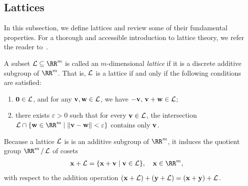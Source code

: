 \documentclass{fundam}
\begin{document}
\subsection{Lattices}\label{Lattices}
In this subsection, we define lattices and review some of their fundamental properties. For a thorough and accessible introduction to lattice theory, we refer the reader to~\cite{peikert2015decade}.

\vspace{0.5cm}
A subset $\Lat \subseteq \RR^m$ is called an $m$-dimensional \textit{lattice} if it is a discrete additive subgroup of $\RR^m$. That is, $\mathcal{L}$ is a lattice if and only if the following conditions are satisfied:
\begin{enumerate}
	\item $\mathbf{0} \in \mathcal{L}$, and for any $\mathbf{v}, \mathbf{w} \in \mathcal{L}$, we have $-\mathbf{v},\, \mathbf{v} + \mathbf{w} \in \mathcal{L}$;
	\item there exists $\varepsilon > 0$ such that for every $\mathbf{v} \in \mathcal{L}$, the intersection $\Lat \cap \{ \vr{w} \in \RR^m \mid \| \vr{v} - \vr{w} \| < \varepsilon \}$ contains only $\mathbf{v}$.
\end{enumerate}


Because a lattice $\mathcal{L}$ is is an additive subgroup of $\RR^{m}$, it induces the quotient group $\quotient{\RR^{m}}{\Lat}$ of cosets
\begin{align*}
	\vr{x} + \Lat = \{ \vr{x}+\vr{v} \mid \vr{v}\in\Lat  \}, ~~~\vr{x}\in\RR^{m},
\end{align*}
with respect to the addition operation $(\mathbf{x}+\mathcal{L}) + (\mathbf{y}+\mathcal{L}) = (\mathbf{x}+\mathbf{y}) + \mathcal{L}$.
%
\end{document}
